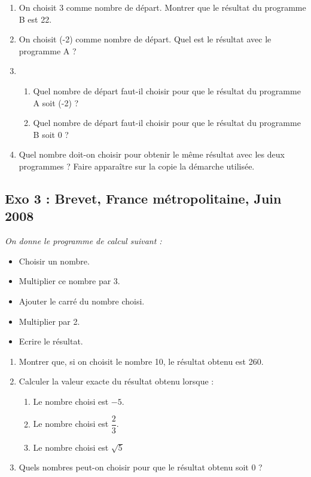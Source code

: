 \documentclass[10pt]{article}
\begin{document}
\begin{enumerate}
	\item  On choisit 3 comme nombre de départ.
	Montrer que le résultat du programme B est 22.
	\item On choisit (-2) comme nombre de départ.
	Quel est le résultat avec le programme A ?
	\item 
	\begin{enumerate}
		\item Quel nombre de départ faut-il choisir pour que le résultat du programme A soit (-2) ?
		\item Quel nombre de départ faut-il choisir pour que le résultat du programme B soit 0 ?
	\end{enumerate}
	\item Quel nombre doit-on choisir pour obtenir le même résultat avec les deux programmes ?
	Faire apparaître sur la copie la démarche utilisée.
\end{enumerate}

\subsection*{Exo 3 : Brevet, France métropolitaine, Juin 2008}
\begin{multicols}{2}
	\textit{On donne le programme de calcul suivant :}

	\begin{itemize}
		\item Choisir un nombre.
		\item Multiplier ce nombre par 3.
		\item Ajouter le carré du nombre choisi.
		\item Multiplier par 2.
		\item Ecrire le résultat.
	\end{itemize}
	
	\begin{enumerate}
		\item Montrer que, si on choisit le nombre 10, le résultat obtenu est 260.
		\item Calculer la valeur exacte du résultat obtenu lorsque :
			\begin{enumerate}
			\item Le nombre choisi est $-5$.
			\item Le nombre choisi est $\dfrac{2}{3}$.
			\item Le nombre choisi est $\sqrt{5}$
			\end{enumerate}
		\item Quels nombres peut-on choisir pour que le résultat obtenu soit 0 ?
	\end{enumerate}
\end{multicols}
\end{document}

